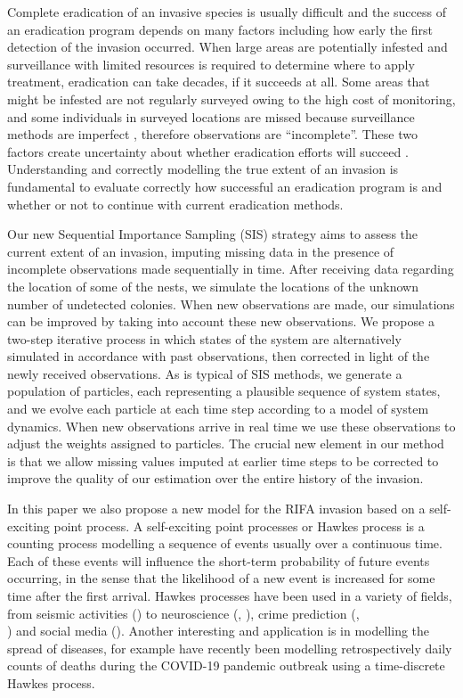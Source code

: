 \documentclass{article}
\begin{document}
Complete eradication of an invasive species is usually difficult and the success of an eradication program depends on many factors including how early the first detection of the invasion occurred. When large areas are potentially infested and surveillance with limited resources is required to determine where to apply treatment, eradication can take decades, if it succeeds at all. Some areas that might be infested are not regularly surveyed owing to the high cost of monitoring, and some individuals in surveyed locations are missed because surveillance methods are imperfect \cite{Royle}, therefore observations are “incomplete”. These two factors create uncertainty about whether eradication efforts will succeed  \cite{Keith}. Understanding and correctly modelling the true extent of an invasion is fundamental to evaluate correctly how successful an eradication program is and whether or not to continue with current eradication methods. 

Our new Sequential Importance Sampling (SIS) strategy aims to assess the current extent of an invasion, imputing missing data in the presence of incomplete observations made sequentially in time. After receiving data regarding the location of some of the nests, we simulate the locations of the unknown number of undetected colonies. When new observations are made, our simulations can be improved by taking into account these new observations. We propose a two-step iterative process in which states of the system are alternatively simulated in accordance with past observations, then corrected in light of the newly received observations. As is typical of SIS methods, we generate a population of particles, each representing a plausible sequence of system states, and we evolve each particle at each time step according to a model of system dynamics. When new observations arrive in real time we use these observations to adjust the weights assigned to particles. The crucial new element in our method is that we allow missing values imputed at earlier time steps to be corrected to improve the quality of our estimation over the entire history of the invasion.

In this paper we also propose a new model for the RIFA invasion based on a self-exciting point process. A self-exciting point processes or Hawkes process \cite{Hawkes71} is a counting process modelling a sequence of events usually over a continuous time. Each of these events will influence the short-term probability of future events occurring, in the sense that the likelihood of a new event is increased for some time after the first arrival. Hawkes processes have been used in a variety of fields, from seismic activities (\cite{Ogata88}) to neuroscience (\cite{Reynaud}, \cite{Chornoboy}), crime prediction (\cite{Mohler13}, \cite{White} \\ \cite{Reinhart2018}) and social media (\cite{Chen}). Another interesting and application is in modelling the spread of diseases, for example \cite{Browning} have recently been modelling retrospectively daily counts of deaths during the COVID-19 pandemic outbreak using a time-discrete Hawkes process.
\end{document}

